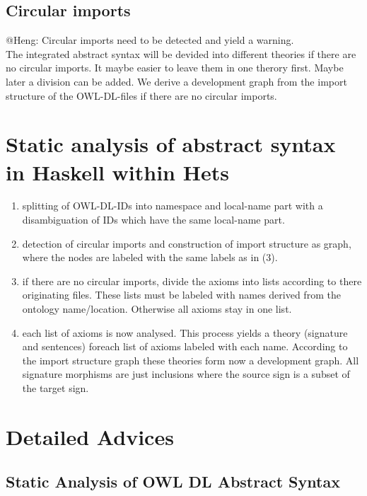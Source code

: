 \documentclass[11pt,a4paper]{article}
\begin{document}
\subsection{Circular imports} 

   @Heng: Circular imports need to be detected and yield a
   warning.\\
   
The integrated abstract syntax will be devided into different
   theories if there are no circular imports. It maybe easier to leave
   them in one therory first. Maybe later a division can be added.
   We derive a development graph from the import structure of the 
   OWL-DL-files if there are no circular imports.

\section{Static analysis of abstract syntax in Haskell within Hets}
   \begin{enumerate}
   \item splitting of OWL-DL-IDs into namespace and local-name part
       with a disambiguation of IDs which have the same local-name
       part.

   \item detection of circular imports and construction of import
       structure as graph, where the nodes are labeled with the same
       labels as in (3).

   \item if there are no circular imports, divide the axioms into lists
       according to there originating files. These lists must be
       labeled with names derived from the ontology name/location.
       Otherwise all axioms stay in one list.

   \item each list of axioms is now analysed. This process yields a
       theory (signature and sentences) foreach list of axioms labeled
       with each name. According to the import structure graph these
       theories form now a development graph. All signature morphisms
       are just inclusions where the source sign is a subset of the
       target sign.
   \end{enumerate}

\section{Detailed Advices}

\subsection{Static Analysis of OWL DL Abstract Syntax}
\end{document}
